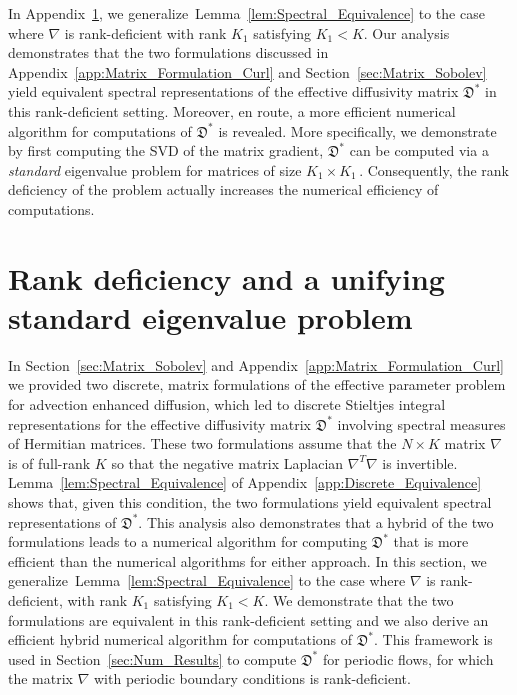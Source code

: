 \documentclass[english,12pt,jmp,graphicx]{revtex4-1}
\newcommand{\lemref}[1]{Lemma~\ref{#1}}
\newcommand{\secref}[1]{Section~\ref{#1}}
\newcommand{\appref}[1]{Appendix~\ref{#1}}
\newcommand{\Dg}{\mathfrak{D}}
\begin{document}
In \appref{app:Eigenvalue_method}, we
generalize~\lemref{lem:Spectral_Equivalence} to the case where
$\nabla$ is rank-deficient with rank $K_1$ satisfying $K_1<K$. Our
analysis demonstrates that the two formulations discussed in
\appref{app:Matrix_Formulation_Curl} and \secref{sec:Matrix_Sobolev}
yield equivalent spectral representations of the effective diffusivity
matrix $\Dg^*$ in this rank-deficient setting. Moreover, en route, a
more efficient numerical algorithm for computations of $\Dg^*$ is
revealed. More specifically, we demonstrate by first computing
the SVD of the matrix gradient, $\Dg^*$ can be computed via a
\emph{standard} eigenvalue problem for matrices of size $K_1\times
K_1\,.$ Consequently, the rank deficiency of the problem actually
increases the numerical efficiency of computations.  







\section{Rank deficiency and a unifying standard eigenvalue
  problem} \label{app:Eigenvalue_method}  
%


In \secref{sec:Matrix_Sobolev} and \appref{app:Matrix_Formulation_Curl} we
provided two discrete, matrix formulations of the effective parameter
problem for advection enhanced diffusion, which led to discrete
Stieltjes integral representations for the effective diffusivity
matrix $\Dg^*$ involving spectral measures of Hermitian
matrices. These two formulations assume that the $N\times K$ 
matrix $\nabla$ is of full-rank $K$ so 
that the negative matrix Laplacian $\nabla^T\nabla$ is
invertible. \lemref{lem:Spectral_Equivalence} of
\appref{app:Discrete_Equivalence} shows that, given this  
condition, the two formulations yield equivalent spectral
representations of $\Dg^*$. This analysis also demonstrates that a
hybrid of the two formulations leads to a numerical algorithm for
computing $\Dg^*$ that is more efficient than the numerical algorithms
for either approach. In this 
section, we generalize~\lemref{lem:Spectral_Equivalence} to the case where
$\nabla$ is rank-deficient, with rank $K_1$ satisfying $K_1<K$. We
demonstrate that the two 
formulations are equivalent in this rank-deficient setting and we also
derive an efficient hybrid numerical algorithm for computations of
$\Dg^*$. This framework is used in \secref{sec:Num_Results} to compute
$\Dg^*$ for  
periodic flows, for which the matrix $\nabla$ with
periodic boundary conditions is rank-deficient.  
\end{document}
